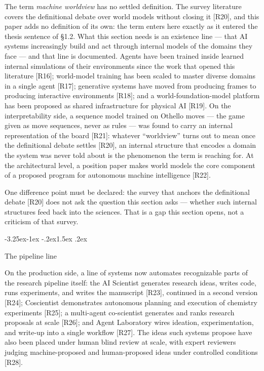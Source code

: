 \documentclass[11pt,a4paper]{article}
\makeatletter
\renewcommand\subsection{\@startsection{subsection}{2}{\z@}%
  {-3.25ex\@plus -1ex \@minus -.2ex}{1.5ex \@plus .2ex}%
  {\normalfont\large\bfseries\raggedright}}
\makeatother
\begin{document}
The term \textit{machine worldview} has no settled definition. The survey literature covers the definitional debate over world models without closing it [R20], and this paper adds no definition of its own: the term enters here exactly as it entered the thesis sentence of §1.2. What this section needs is an existence line — that AI systems increasingly build and act through internal models of the domains they face — and that line is documented. Agents have been trained inside learned internal simulations of their environments since the work that opened this literature [R16]; world-model training has been scaled to master diverse domains in a single agent [R17]; generative systems have moved from producing frames to producing interactive environments [R18]; and a world-foundation-model platform has been proposed as shared infrastructure for physical AI [R19]. On the interpretability side, a sequence model trained on Othello moves — the game given as move sequences, never as rules — was found to carry an internal representation of the board [R21]: whatever ``worldview'' turns out to mean once the definitional debate settles [R20], an internal structure that encodes a domain the system was never told about is the phenomenon the term is reaching for. At the architectural level, a position paper makes world models the core component of a proposed program for autonomous machine intelligence [R22].

One difference point must be declared: the survey that anchors the definitional debate [R20] does not ask the question this section asks — whether such internal structures feed back into the sciences. That is a gap this section opens, not a criticism of that survey.

\subsection{The pipeline line}

On the production side, a line of systems now automates recognizable parts of the research pipeline itself: the AI Scientist generates research ideas, writes code, runs experiments, and writes the manuscript [R23], continued in a second version [R24]; Coscientist demonstrates autonomous planning and execution of chemistry experiments [R25]; a multi-agent co-scientist generates and ranks research proposals at scale [R26]; and Agent Laboratory wires ideation, experimentation, and write-up into a single workflow [R27]. The ideas such systems propose have also been placed under human blind review at scale, with expert reviewers judging machine-proposed and human-proposed ideas under controlled conditions [R28].
\end{document}
